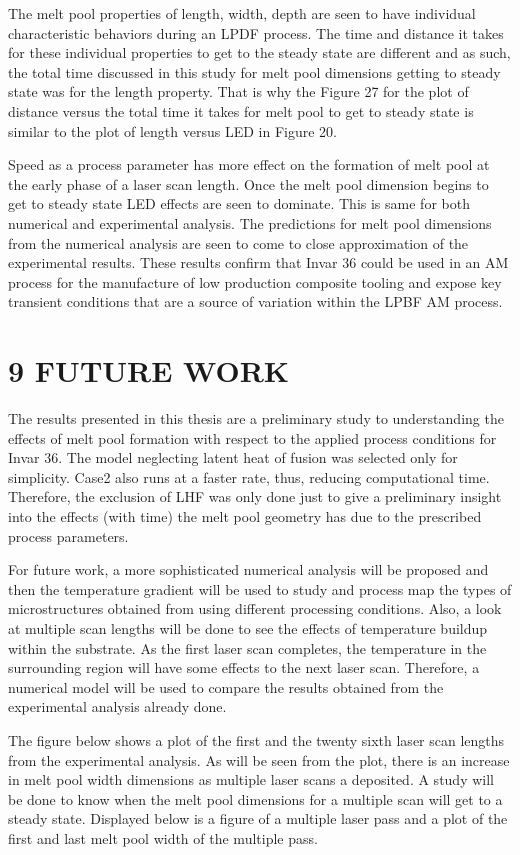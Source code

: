 \documentclass[10pt]{article}
\begin{document}
The melt pool properties of length, width, depth are seen to have individual characteristic behaviors during an LPDF process. The time and distance it takes for these individual properties to get to the steady state are different and as such, the total time discussed in this study for melt pool dimensions getting to steady state was for the length property. That is why the Figure 27 for the plot of distance versus the total time it takes for melt pool to get to steady state is similar to the plot of length versus LED in Figure 20.

Speed as a process parameter has more effect on the formation of melt pool at the early phase of a laser scan length. Once the melt pool dimension begins to get to steady state LED effects are seen to dominate. This is same for both numerical and experimental analysis. The predictions for melt pool dimensions from the numerical analysis are seen to come to close approximation of the experimental results. These results confirm that Invar 36 could be used in an AM process for the manufacture of low production composite tooling and expose key transient conditions that are a source of variation within the LPBF AM process.

\section*{9 FUTURE WORK}
The results presented in this thesis are a preliminary study to understanding the effects of melt pool formation with respect to the applied process conditions for Invar 36. The model neglecting latent heat of fusion was selected only for simplicity. Case2 also runs at a faster rate, thus, reducing computational time. Therefore, the exclusion of LHF was only done just to give a preliminary insight into the effects (with time) the melt pool geometry has due to the prescribed process parameters.

For future work, a more sophisticated numerical analysis will be proposed and then the temperature gradient will be used to study and process map the types of microstructures obtained from using different processing conditions. Also, a look at multiple scan lengths will be done to see the effects of temperature buildup within the substrate. As the first laser scan completes, the temperature in the surrounding region will have some effects to the next laser scan. Therefore, a numerical model will be used to compare the results obtained from the experimental analysis already done.

The figure below shows a plot of the first and the twenty sixth laser scan lengths from the experimental analysis. As will be seen from the plot, there is an increase in melt pool width dimensions as multiple laser scans a deposited. A study will be done to know when the melt pool dimensions for a multiple scan will get to a steady state. Displayed below is a figure of a multiple laser pass and a plot of the first and last melt pool width of the multiple pass.
\end{document}
